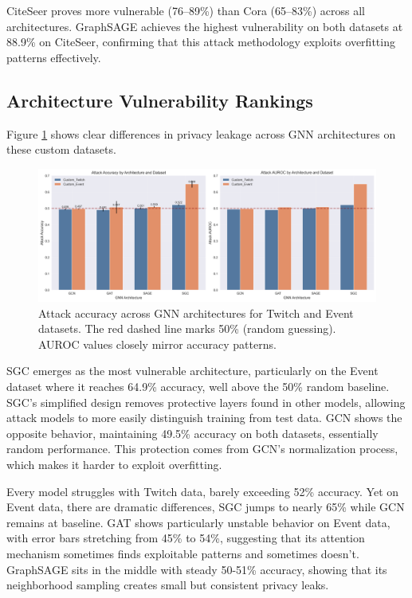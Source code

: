 \documentclass{article}
\begin{document}
CiteSeer proves more vulnerable (76--89\%) than Cora (65--83\%) across all architectures. GraphSAGE achieves the highest vulnerability on both datasets at 88.9\% on CiteSeer, confirming that this attack methodology exploits overfitting patterns effectively.

\subsection{Architecture Vulnerability Rankings}
Figure \ref{fig:attack-performance} shows clear differences in privacy leakage across GNN architectures on these custom datasets.

\begin{figure}[H]
\centering
\includegraphics[width=\textwidth]{../Results/visualizations/attack_performance_comparison.png}
\caption{Attack accuracy across GNN architectures for Twitch and Event datasets. The red dashed line marks 50\% (random guessing). AUROC values closely mirror accuracy patterns.}
\label{fig:attack-performance}
\end{figure}

SGC emerges as the most vulnerable architecture, particularly on the Event dataset where it reaches 64.9\% accuracy, well above the 50\% random baseline. SGC's simplified design removes protective layers found in other models, allowing attack models to more easily distinguish training from test data. GCN shows the opposite behavior, maintaining 49.5\% accuracy on both datasets, essentially random performance. This protection comes from GCN's normalization process, which makes it harder to exploit overfitting.

Every model struggles with Twitch data, barely exceeding 52\% accuracy. Yet on Event data, there are dramatic differences, SGC jumps to nearly 65\% while GCN remains at baseline. GAT shows particularly unstable behavior on Event data, with error bars stretching from 45\% to 54\%, suggesting that its attention mechanism sometimes finds exploitable patterns and sometimes doesn't. GraphSAGE sits in the middle with steady 50-51\% accuracy, showing that its neighborhood sampling creates small but consistent privacy leaks.
\end{document}
